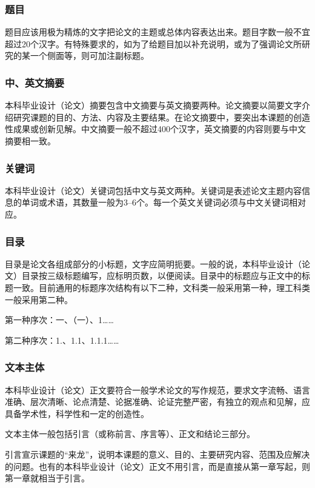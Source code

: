 \documentclass{HDU-Bachelor-Thesis}
\begin{document}
\subsubsection{题目}

题目应该用极为精炼的文字把论文的主题或总体内容表达出来。题目字数一般不宜超过20个汉字。有特殊要求的，如为了给题目加以补充说明，或为了强调论文所研究的某一个侧面等，则可加注副标题。

\subsubsection{中、英文摘要}

本科毕业设计（论文）摘要包含中文摘要与英文摘要两种。论文摘要以简要文字介绍研究课题的目的、方法、内容及主要结果。在论文摘要中，要突出本课题的创造性成果或创新见解。中文摘要一般不超过400个汉字，英文摘要的内容则要与中文摘要相一致。

\subsubsection{关键词}

本科毕业设计（论文）关键词包括中文与英文两种。关键词是表述论文主题内容信息的单词或术语，其数量一般为3–6个。每一个英文关键词必须与中文关键词相对应。

\subsubsection{目录}

目录是论文各组成部分的小标题，文字应简明扼要。一般的说，本科毕业设计（论文）目录按三级标题编写，应标明页数，以便阅读。目录中的标题应与正文中的标题一致。目前通用的标题序次结构有以下二种，文科类一般采用第一种，理工科类一般采用第二种。

第一种序次：一、（一）、1……

第二种序次：1.、1.1、1.1.1……

\subsubsection{文本主体}

本科毕业设计（论文）正文要符合一般学术论文的写作规范，要求文字流畅、语言准确、层次清晰、论点清楚、论据准确、论证完整严密，有独立的观点和见解，应具备学术性，科学性和一定的创造性。

文本主体一般包括引言（或称前言、序言等）、正文和结论三部分。

引言宣示课题的“来龙”，说明本课题的意义、目的、主要研究内容、范围及应解决的问题。也有的本科毕业设计（论文）正文不用引言，而是直接从第一章写起，则第一章就相当于引言。
\end{document}
